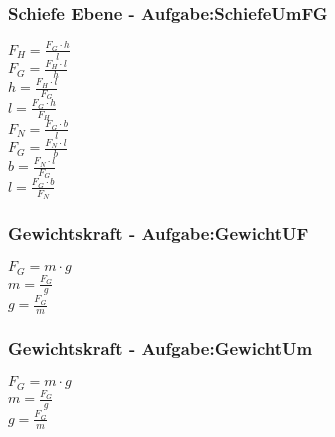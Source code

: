 \subsubsection{Schiefe Ebene - Aufgabe:SchiefeUmFG} 
\begin{minipage}{0.45\textwidth} 
$ F_{H}  = \frac{F_{G} \cdot h}{ l} $\\ 
$ F_{G}  = \frac{F_{H} \cdot l}{ h} $\\ 
$ h = \frac{F_{H} \cdot l}{ F_{G} } $\\ 
$ l = \frac{F_{G} \cdot h}{ F_{H} } $\\ 
$ F_{N}  = \frac{F_{G} \cdot b}{ l} $\\ 
$ F_{G}  = \frac{F_{N} \cdot l}{ b} $\\ 
$ b = \frac{F_{N} \cdot l}{ F_{G} } $\\ 
$ l = \frac{F_{G} \cdot b}{ F_{N} } $\\ 
\end{minipage} 
\begin{minipage}{0.45\textwidth} 
 
\end{minipage} 
\subsubsection{Gewichtskraft - Aufgabe:GewichtUF} 
\begin{minipage}{0.45\textwidth} 
$ F_{G}  = m\cdot g $\\ 
$ m = \frac{F_{G} }{g} $\\ 
$ g = \frac{F_{G} }{m} $\\ 
\end{minipage} 
\begin{minipage}{0.45\textwidth} 
 
\end{minipage} 
\subsubsection{Gewichtskraft - Aufgabe:GewichtUm} 
\begin{minipage}{0.45\textwidth} 
$ F_{G}  = m\cdot g $\\ 
$ m = \frac{F_{G} }{g} $\\ 
$ g = \frac{F_{G} }{m} $\\ 
\end{minipage} 
\begin{minipage}{0.45\textwidth} 
 
\end{minipage} 

